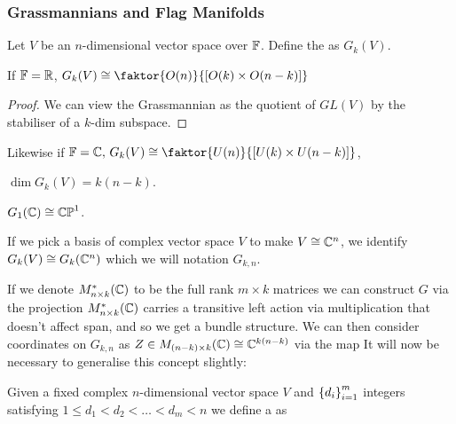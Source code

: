\documentclass{article}
\begin{document}
\subsubsection{Grassmannians and Flag Manifolds}
\begin{definition}
	Let $V$ be an $n$-dimensional vector space over $\mathbb{F}$. Define the  as $G_k(V)$. 
\end{definition}

\begin{lemma}
	If $\mathbb{F}= \mathbb{R}$, $G_k(V)\cong \faktor{O(n)}{[O(k) \times O(n-k)]}$
\end{lemma}
\begin{proof}
	We can view the Grassmannian as the quotient of $GL(V)$ by the stabiliser of a $k$-dim subspace. 
\end{proof}
\begin{remark}
	Likewise if $\mbb{F}=\mbb{C}, \, G_k(V) \cong \faktor{U(n)}{[U(k) \times U(n-k)]}$,
\end{remark}
\begin{corollary}
	$\dim G_k(V) = k(n-k)$. 
\end{corollary}

\begin{example} 
	$G_1(\mathbb{C}) \cong \mathbb{CP}^1$. 
\end{example}

\begin{notation}
	If we pick a basis of complex vector space $V$ to make $V \cong \mathbb{C}^n$, we identify $G_k(V) \cong G_k(\mathbb{C}^n)$ which we will notation $G_{k,n}$. 
\end{notation}

If we denote $M^\ast_{n \times k}(\mathbb{C})$ to be the full rank $m \times k$ matrices we can construct $G$ via the projection 
$M^\ast_{n \times k}(\mathbb{C})$ carries a transitive left action via multiplication that doesn't affect span, and so we get a bundle structure. We can then consider coordinates on $G_{k,n}$ as $Z \in M_{(n-k) \times k}(\mathbb{C})\cong \mathbb{C}^{k(n-k)}$ via the map 
It will now be necessary to generalise this concept slightly:
\begin{definition}
	Given a fixed complex $n$-dimensional vector space $V$ and $\left\{ d_i \right\}_{i=1}^m$ integers satisfying $1 \leq d_1 < d_2 < \dots < d_m < n$ we define a  as 
\end{definition}
\end{document}
